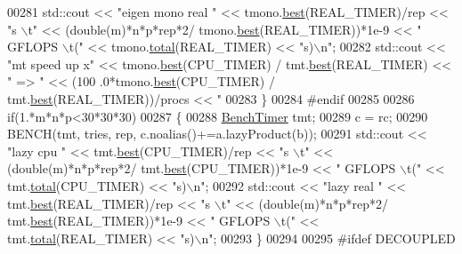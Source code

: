 \begin{DoxyCode}
00281     std::cout << \textcolor{stringliteral}{"eigen mono real   "} << tmono.\hyperlink{class_eigen_1_1_bench_timer_ae8b673b0fa356d3432c7a65c79e8af0e}{best}(REAL\_TIMER)/rep << \textcolor{stringliteral}{"s  \(\backslash\)t"} << (double(m)*n*p*rep*2/
      tmono.\hyperlink{class_eigen_1_1_bench_timer_ae8b673b0fa356d3432c7a65c79e8af0e}{best}(REAL\_TIMER))*1e-9 <<  \textcolor{stringliteral}{" GFLOPS \(\backslash\)t("} << tmono.\hyperlink{class_eigen_1_1_bench_timer_af341aa613dba2d4a3d167093197e4e7a}{total}(REAL\_TIMER) << \textcolor{stringliteral}{"s)\(\backslash\)n"};
00282     std::cout << \textcolor{stringliteral}{"mt speed up x"} << tmono.\hyperlink{class_eigen_1_1_bench_timer_ae8b673b0fa356d3432c7a65c79e8af0e}{best}(CPU\_TIMER) / tmt.\hyperlink{class_eigen_1_1_bench_timer_ae8b673b0fa356d3432c7a65c79e8af0e}{best}(REAL\_TIMER)  << \textcolor{stringliteral}{" => "} << (100
      .0*tmono.\hyperlink{class_eigen_1_1_bench_timer_ae8b673b0fa356d3432c7a65c79e8af0e}{best}(CPU\_TIMER) / tmt.\hyperlink{class_eigen_1_1_bench_timer_ae8b673b0fa356d3432c7a65c79e8af0e}{best}(REAL\_TIMER))/procs << \textcolor{stringliteral}{"%
00283   \}
00284 \textcolor{preprocessor}{  #endif}
00285   
00286   \textcolor{keywordflow}{if}(1.*m*n*p<30*30*30)
00287   \{
00288       \hyperlink{class_eigen_1_1_bench_timer}{BenchTimer} tmt;
00289       c = rc;
00290       BENCH(tmt, tries, rep, c.noalias()+=a.lazyProduct(b));
00291       std::cout << \textcolor{stringliteral}{"lazy cpu         "} << tmt.\hyperlink{class_eigen_1_1_bench_timer_ae8b673b0fa356d3432c7a65c79e8af0e}{best}(CPU\_TIMER)/rep  << \textcolor{stringliteral}{"s  \(\backslash\)t"} << (double(m)*n*p*rep*2/
      tmt.\hyperlink{class_eigen_1_1_bench_timer_ae8b673b0fa356d3432c7a65c79e8af0e}{best}(CPU\_TIMER))*1e-9  <<  \textcolor{stringliteral}{" GFLOPS \(\backslash\)t("} << tmt.\hyperlink{class_eigen_1_1_bench_timer_af341aa613dba2d4a3d167093197e4e7a}{total}(CPU\_TIMER)  << \textcolor{stringliteral}{"s)\(\backslash\)n"};
00292       std::cout << \textcolor{stringliteral}{"lazy real        "} << tmt.\hyperlink{class_eigen_1_1_bench_timer_ae8b673b0fa356d3432c7a65c79e8af0e}{best}(REAL\_TIMER)/rep << \textcolor{stringliteral}{"s  \(\backslash\)t"} << (double(m)*n*p*rep*2/
      tmt.\hyperlink{class_eigen_1_1_bench_timer_ae8b673b0fa356d3432c7a65c79e8af0e}{best}(REAL\_TIMER))*1e-9 <<  \textcolor{stringliteral}{" GFLOPS \(\backslash\)t("} << tmt.\hyperlink{class_eigen_1_1_bench_timer_af341aa613dba2d4a3d167093197e4e7a}{total}(REAL\_TIMER) << \textcolor{stringliteral}{"s)\(\backslash\)n"};
00293   \}
00294   
00295 \textcolor{preprocessor}{  #ifdef DECOUPLED}
}
\end{DoxyCode}
